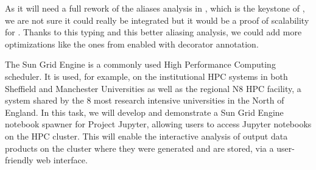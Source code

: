 \begin{workpackage}
\begin{tasklist}
\begin{task}[title=Explorative task: Add support for classes in \Pythran.]
  As it will need a full rework of the aliases analysis in \Pythran, which is
  the keystone of \Pythran, we are not sure it could really
  be integrated but it would be a proof of scalability for \Pythran.
  Thanks to this typing and this better aliasing analysis, we could add more
  optimizations like the ones from \Cython enabled with decorator annotation.
\end{task}

\begin{task}[title=Sun Grid Engine Integration in Project Jupyter Hub]
The Sun Grid Engine is a commonly used High Performance Computing scheduler. It is used, for example, on the institutional HPC systems in both Sheffield and Manchester Universities as well as the regional N8 HPC facility, a system shared by the 8 most research intensive universities in the North of England. In this task, we will develop and demonstrate a Sun Grid Engine notebook spawner for Project Jupyter, allowing users to access Jupyter notebooks on the HPC cluster. This will enable the interactive analysis of output data products on the cluster where they were generated and are stored, via a user-friendly web interface.
\end{task}


\end{tasklist}
\end{workpackage}
